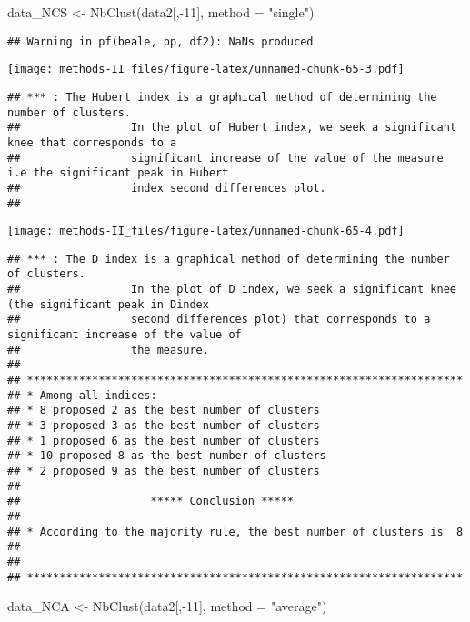 \documentclass[
]{article}
\newenvironment{Shaded}{\begin{snugshade}}{\end{snugshade}}
\newcommand{\AttributeTok}[1]{\textcolor[rgb]{0.77,0.63,0.00}{#1}}
\newcommand{\DecValTok}[1]{\textcolor[rgb]{0.00,0.00,0.81}{#1}}
\newcommand{\FunctionTok}[1]{\textcolor[rgb]{0.00,0.00,0.00}{#1}}
\newcommand{\NormalTok}[1]{#1}
\newcommand{\OtherTok}[1]{\textcolor[rgb]{0.56,0.35,0.01}{#1}}
\newcommand{\SpecialCharTok}[1]{\textcolor[rgb]{0.00,0.00,0.00}{#1}}
\newcommand{\StringTok}[1]{\textcolor[rgb]{0.31,0.60,0.02}{#1}}
\begin{document}
\begin{Shaded}
\begin{Highlighting}[]
\NormalTok{data\_NCS }\OtherTok{\textless{}{-}} \FunctionTok{NbClust}\NormalTok{(data2[,}\SpecialCharTok{{-}}\DecValTok{11}\NormalTok{], }\AttributeTok{method =} \StringTok{"single"}\NormalTok{)}
\end{Highlighting}
\end{Shaded}

\begin{verbatim}
## Warning in pf(beale, pp, df2): NaNs produced
\end{verbatim}

\texttt{[image: methods-II\_files/figure-latex/unnamed-chunk-65-3.pdf]}

\begin{verbatim}
## *** : The Hubert index is a graphical method of determining the number of clusters.
##                 In the plot of Hubert index, we seek a significant knee that corresponds to a 
##                 significant increase of the value of the measure i.e the significant peak in Hubert
##                 index second differences plot. 
## 
\end{verbatim}

\texttt{[image: methods-II\_files/figure-latex/unnamed-chunk-65-4.pdf]}

\begin{verbatim}
## *** : The D index is a graphical method of determining the number of clusters. 
##                 In the plot of D index, we seek a significant knee (the significant peak in Dindex
##                 second differences plot) that corresponds to a significant increase of the value of
##                 the measure. 
##  
## ******************************************************************* 
## * Among all indices:                                                
## * 8 proposed 2 as the best number of clusters 
## * 3 proposed 3 as the best number of clusters 
## * 1 proposed 6 as the best number of clusters 
## * 10 proposed 8 as the best number of clusters 
## * 2 proposed 9 as the best number of clusters 
## 
##                    ***** Conclusion *****                            
##  
## * According to the majority rule, the best number of clusters is  8 
##  
##  
## *******************************************************************
\end{verbatim}

\begin{Shaded}
\begin{Highlighting}[]
\NormalTok{data\_NCA }\OtherTok{\textless{}{-}} \FunctionTok{NbClust}\NormalTok{(data2[,}\SpecialCharTok{{-}}\DecValTok{11}\NormalTok{], }\AttributeTok{method =} \StringTok{"average"}\NormalTok{)}
\end{Highlighting}
\end{Shaded}
\end{document}
